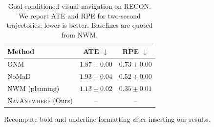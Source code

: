\documentclass{article}
\newcommand{\method}{\textsc{NavAnywhere}}
\newcommand{\TBD}{\textcolor{gray}{--}}
\newcommand{\best}[1]{\textbf{#1}}
\begin{document}
\begin{table}[t]
  \caption{Goal-conditioned visual navigation on RECON. We report ATE and RPE
  for two-second trajectories; lower is better. Baselines are quoted from NWM.}
  \label{tab:main_sota_navigation}
  \centering
  \small
  \setlength{\tabcolsep}{9pt}
  \renewcommand{\arraystretch}{1.08}
  \begin{threeparttable}
    \begin{tabular}{lcc}
      \toprule
      Method & ATE $\downarrow$ & RPE $\downarrow$ \\
      \midrule
      GNM & $1.87{\pm}0.00$ & $0.73{\pm}0.00$ \\
      NoMaD & $1.93{\pm}0.04$ & $0.52{\pm}0.00$ \\
      NWM (planning) & \best{$1.13{\pm}0.02$} & \best{$0.35{\pm}0.01$} \\
      \midrule
      \method{} (Ours) & \TBD & \TBD \\
      \bottomrule
    \end{tabular}
    \begin{tablenotes}[flushleft]\footnotesize
      \item Recompute bold and underline formatting after inserting our results.
    \end{tablenotes}
  \end{threeparttable}
\end{table}
\end{document}
